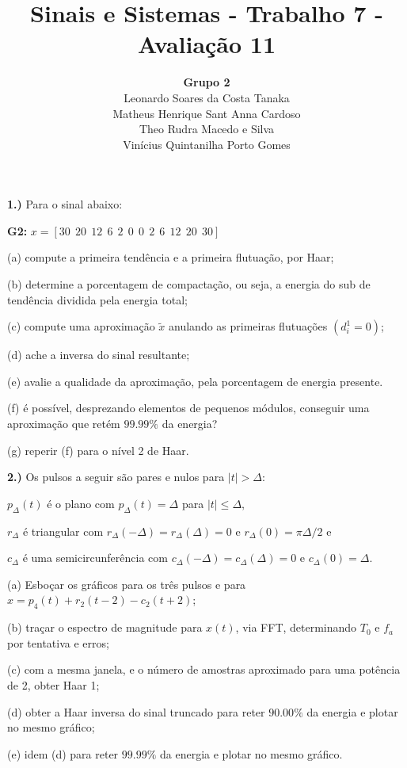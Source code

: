 \documentclass[10pt]{article}
\title{Sinais e Sistemas - Trabalho 7 - Avaliação 11}
\author{
    \textbf{Grupo 2}\\
    Leonardo Soares da Costa Tanaka\\
    Matheus Henrique Sant Anna Cardoso\\
    Theo Rudra Macedo e Silva\\
    Vinícius Quintanilha Porto Gomes
}
\date{}
\begin{document}
\maketitle
\thispagestyle{capa}
\newpage

\textbf{1.)} Para o sinal abaixo:

\textbf{G2: } $x = [30 \ \ 20 \ \ 12 \ \ 6 \ \ 2 \ \ 0 \ \ 0 \ \ 2 \ \ 6 \ \ 12 \ \ 20 \ \ 30]$

(a) compute a primeira tendência e a primeira flutuação, por Haar;

(b) determine a porcentagem de compactação, ou seja, a energia do sub de tendência dividida pela energia total;

(c) compute uma aproximação $\tilde{x}$ anulando as primeiras flutuações $(d_i^1 = 0)$;

(d) ache a inversa do sinal resultante;

(e) avalie a qualidade da aproximação, pela porcentagem de energia presente.

(f) é possível, desprezando elementos de pequenos módulos, conseguir uma aproximação que retém $99.99\%$ da energia?

(g) reperir (f) para o nível 2 de Haar.

\vspace{\baselineskip}

\textbf{2.)} Os pulsos a seguir são pares e nulos para $|t| > \Delta:$

$p_{\Delta}(t)$ é o plano com $p_{\Delta}(t) = \Delta$ para $|t| \leq \Delta$,

$r_{\Delta}$ é triangular com $r_{\Delta}(-\Delta) = r_{\Delta}(\Delta) = 0$ e $r_{\Delta}(0) = \pi \Delta / 2$ e

$c_{\Delta}$ é uma semicircunferência com $c_{\Delta}(-\Delta) = c_{\Delta}(\Delta) = 0$ e $c_{\Delta}(0) = \Delta$.

\vspace{\baselineskip}

(a) Esboçar os gráficos para os três pulsos e para $x = p_4(t) + r_2(t - 2) - c_2(t + 2)$;

(b) traçar o espectro de magnitude para $x(t)$, via FFT, determinando $T_0$ e $f_a$ por tentativa e erros;

(c) com a mesma janela, e o número de amostras aproximado para uma potência de 2, obter Haar 1;

(d) obter a Haar inversa do sinal truncado para reter $90.00\%$ da energia e plotar no mesmo gráfico;

(e) idem (d) para reter $99.99\%$ da energia e plotar no mesmo gráfico.
\end{document}
